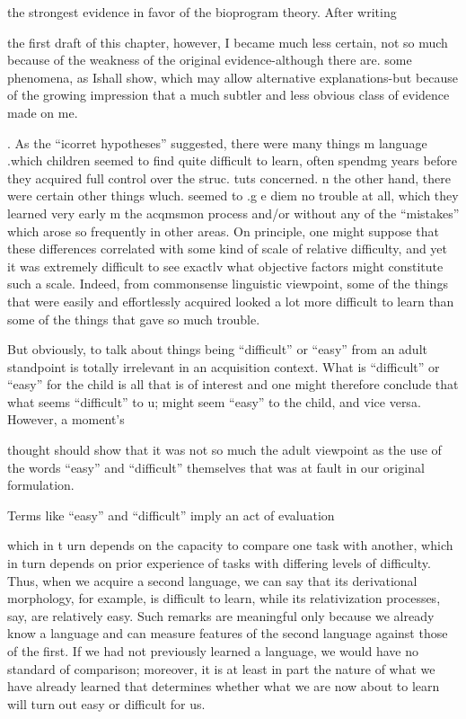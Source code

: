 the strongest evidence in favor of the bioprogram theory. After writing

the first draft of this chapter, however, I became much less certain, not so much because of the weakness of the original evidence-although there are. some phenomena, as Ishall show, which may allow alternative explanations{}-but because of the growing impression that a much subtler and less obvious class of evidence made on me.

. As the ``icorret hypotheses'' suggested, there were many things m language .which children seemed to find quite difficult to learn, often spendmg years before they acquired full control over the struc. tuts concerned. n the other hand, there were certain other things wluch. seemed to .g e diem no trouble at all, which they learned very early m the acqmsmon process and/or without any of the ``mistakes'' which arose so frequently in other areas. On principle, one might suppose that these differences correlated with some kind of scale of relative difficulty, and yet it was extremely difficult to see exactlv what objective factors might constitute such a scale. Indeed, from commonsense linguistic viewpoint, some of the things that were easily and effortlessly acquired looked a lot more difficult to learn than some of the things that gave so much trouble.

But obviously, to talk about things being ``difficult'' or ``easy'' from an adult standpoint is totally irrelevant in an acquisition context. What is ``difficult'' or ``easy'' for the child is all that is of interest and one might therefore conclude that what seems ``difficult'' to u; might seem ``easy'' to the child, and vice versa. However, a moment's


thought should show that it was not so much the adult viewpoint as the use of the words ``easy'' and ``difficult'' themselves that was at fault in our original formulation.

Terms like ``easy'' and ``difficult'' imply an act of evaluation

which in t urn depends on the capacity to compare one task with another, which in turn depends on prior experience of tasks with differing levels of difficulty. Thus, when we acquire a second language, we can say that its derivational morphology, for example, is difficult to learn, while its relativization processes, say, are relatively easy. Such remarks are meaningful only because we already know a language and can measure features of the second language against those of the first. If we had not previously learned a language, we would have no standard of comparison; moreover, it is at least in part the nature of what we have already learned that determines whether what we are now about to learn will turn out easy or difficult for us.

